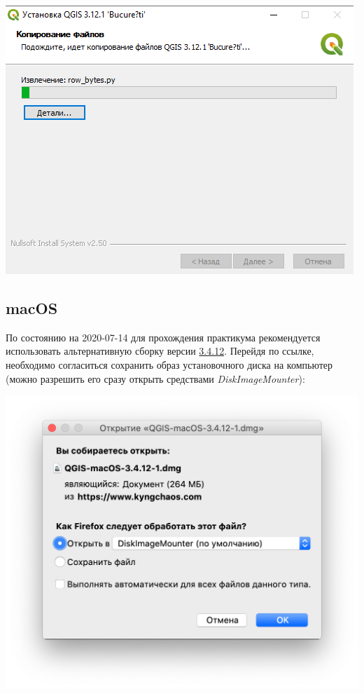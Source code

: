 \documentclass[
  12pt,
]{book}
\begin{document}
\includegraphics{images/installation_instruction_win/win05.png}

\hypertarget{macos}{%
\subsection*{macOS}\label{macos}}

По состоянию на 2020-07-14 для прохождения практикума рекомендуется использовать альтернативную сборку версии \href{https://www.kyngchaos.com/files/software/qgis/QGIS-macOS-3.4.12-1.dmg}{3.4.12}. Перейдя по ссылке, необходимо согласиться сохранить образ установочного диска на компьютер (можно разрешить его сразу открыть средствами \emph{DiskImageMounter}):

\includegraphics{images/installation_instruction_mac/mac01.png}
\end{document}
